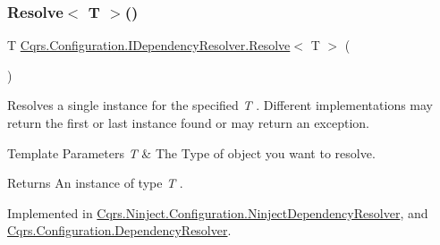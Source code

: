 \mbox{\label{interfaceCqrs_1_1Configuration_1_1IDependencyResolver_a9dc7694a365209a5ef05270a7cfa7b6b_a9dc7694a365209a5ef05270a7cfa7b6b}} 
\subsubsection{\texorpdfstring{Resolve$<$ T $>$()}{Resolve< T >()}}
{\footnotesize\ttfamily T \hyperlink{interfaceCqrs_1_1Configuration_1_1IDependencyResolver_aa455096b7b94fc1d64904bc67830ec06_aa455096b7b94fc1d64904bc67830ec06}{Cqrs.\+Configuration.\+I\+Dependency\+Resolver.\+Resolve}$<$ T $>$ (\begin{DoxyParamCaption}{ }\end{DoxyParamCaption})}



Resolves a single instance for the specified {\itshape T} . Different implementations may return the first or last instance found or may return an exception. 


\begin{DoxyTemplParams}{Template Parameters}
{\em T} & The Type of object you want to resolve.\\
\hline
\end{DoxyTemplParams}
\begin{DoxyReturn}{Returns}
An instance of type {\itshape T} .
\end{DoxyReturn}


Implemented in \hyperlink{classCqrs_1_1Ninject_1_1Configuration_1_1NinjectDependencyResolver_ab044ba98051bdd3111e0c1be6259de10_ab044ba98051bdd3111e0c1be6259de10}{Cqrs.\+Ninject.\+Configuration.\+Ninject\+Dependency\+Resolver}, and \hyperlink{classCqrs_1_1Configuration_1_1DependencyResolver_a1eb177fc6c914b45d138642fb6d9454d_a1eb177fc6c914b45d138642fb6d9454d}{Cqrs.\+Configuration.\+Dependency\+Resolver}.

